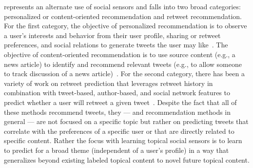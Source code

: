 %

%

% 

\vspace{2mm}
 represents an alternate use of
social sensors and falls into two broad categories: personalized or
content-oriented recommendation and retweet recommendation.  For the
first category, the objective of personalized recommendation is to
observe a user's interests and behavior from their user profile,
sharing or retweet preferences, and social relations to generate
tweets the user may like~\cite{Yan,chen}.  The objective of
content-oriented recommendation is to use source content (e.g., a news
article) to identify and recommend relevant tweets (e.g., to allow
someone to track discussion of a news article)~\cite{Krestel}.  For
the second category, there has been a variety of work on retweet
prediction that leverages retweet history in combination with
tweet-based, author-based, and social network features to predict
whether a user will retweet a given
tweet~\cite{can,xu,petrovicOsborne}.  Despite the fact that all of
these methods recommend tweets, they --- and recommendation methods in
general --- are not focused on a specific topic but rather on
predicting tweets that correlate with the preferences of a specific
user or that are directly related to specific content.  Rather the
focus with learning topical social sensors is to learn to predict for
a broad theme (independent of a user's profile) in a way that
generalizes beyond existing labeled topical content to novel future
topical content.

